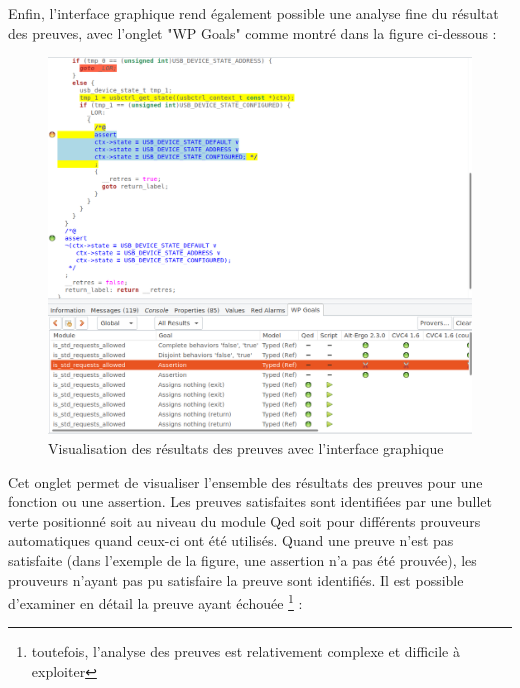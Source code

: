 \newpage

\noindent Enfin, l'interface graphique rend également possible une analyse fine du résultat des preuves, avec l'onglet "WP Goals" comme montré dans la figure ci-dessous :

\begin{figure}[!h]
\centering
\includegraphics[width=16cm]{images/visualisation_preuves_wp_GUI}
\caption{Visualisation des résultats des preuves avec l'interface graphique}
\label{Visualisation des résultats des preuves avec l'interface graphique}
\end{figure}

\newpage

\noindent Cet onglet permet de visualiser l'ensemble des résultats des preuves pour une fonction ou une assertion. Les preuves satisfaites sont identifiées par une bullet verte positionné soit au niveau du module Qed soit pour différents prouveurs automatiques quand ceux-ci ont été utilisés. Quand une preuve n'est pas satisfaite (dans l'exemple de la figure, une assertion n'a pas été prouvée), les prouveurs n'ayant pas pu satisfaire la preuve sont identifiés. Il est possible d'examiner en détail la preuve ayant échouée \footnote{toutefois, l'analyse des preuves est relativement complexe et difficile à exploiter} :

